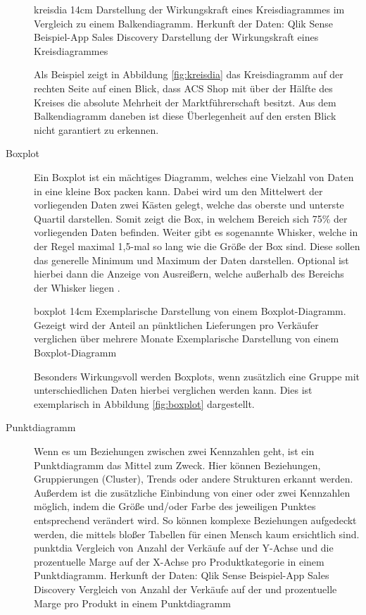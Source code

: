 \begin{description}
\bild
{kreisdia}
{14cm}
{Darstellung der Wirkungskraft eines Kreisdiagrammes im Vergleich zu einem Balkendiagramm. Herkunft der Daten: Qlik Sense Beispiel-App \glqq Sales Discovery\grqq}
{Darstellung der Wirkungskraft eines Kreisdiagrammes}

Als Beispiel zeigt in Abbildung \ref{fig:kreisdia} das Kreisdiagramm auf der rechten Seite auf einen Blick, dass \glqq ACS Shop\grqq{} mit über der Hälfte des Kreises die absolute Mehrheit der Marktführerschaft besitzt.
Aus dem Balkendiagramm daneben ist diese Überlegenheit auf den ersten Blick nicht garantiert zu erkennen.

\item[Boxplot] Ein Boxplot ist ein mächtiges Diagramm, welches eine Vielzahl von Daten in eine kleine \glqq Box\grqq{} packen kann.
Dabei wird um den Mittelwert der vorliegenden Daten zwei Kästen gelegt, welche das oberste und unterste Quartil darstellen.
Somit zeigt die \glqq Box\grqq{}, in welchem Bereich sich 75\% der vorliegenden Daten befinden.
Weiter gibt es sogenannte \glqq Whisker\grqq{}, welche in der Regel maximal 1,5-mal so lang wie die Größe der Box sind. 
Diese sollen das generelle Minimum und Maximum der Daten darstellen.
Optional ist hierbei dann die Anzeige von Ausreißern, welche außerhalb des Bereichs der Whisker liegen \cite[S.59]{FischerStabel.2018}.

\bild
{boxplot}
{14cm}
{Exemplarische Darstellung von einem Boxplot-Diagramm. Gezeigt wird der Anteil an pünktlichen Lieferungen pro Verkäufer verglichen über mehrere Monate}
{Exemplarische Darstellung von einem Boxplot-Diagramm}

Besonders Wirkungsvoll werden Boxplots, wenn zusätzlich eine Gruppe mit unterschiedlichen Daten hierbei verglichen werden kann.
Dies ist exemplarisch in Abbildung \ref{fig:boxplot} dargestellt.
\item[Punktdiagramm] Wenn es um Beziehungen zwischen zwei Kennzahlen geht, ist ein Punktdiagramm das Mittel zum Zweck.
Hier können Beziehungen, Gruppierungen (Cluster), Trends oder andere Strukturen erkannt werden.
Außerdem ist die zusätzliche Einbindung von einer oder zwei Kennzahlen möglich, indem die Größe und/oder Farbe des jeweiligen Punktes entsprechend verändert wird.
So können komplexe Beziehungen aufgedeckt werden, die mittels bloßer Tabellen für einen Mensch kaum ersichtlich sind.
\bildbreit
{punktdia}
{Vergleich von Anzahl der Verkäufe auf der Y-Achse und die prozentuelle Marge auf der X-Achse pro Produktkategorie in einem Punktdiagramm. Herkunft der Daten: Qlik Sense Beispiel-App \glqq Sales Discovery\grqq}
{Vergleich von Anzahl der Verkäufe auf der und prozentuelle Marge pro Produkt in einem Punktdiagramm}


\end{description}
